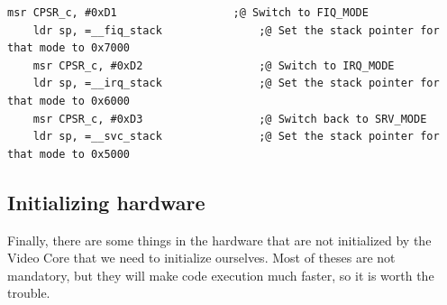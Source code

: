 \documentclass[12pt, svgnames]{book}
\begin{document}
\begin{lstlisting}[language=ASM,title={Code provided by \href{https://www.raspberrypi.org/forums/memberlist.php?mode=viewprofile&u=213434}{Leon de Boer}},captionpos=b]
	msr CPSR_c, #0xD1                  ;@ Switch to FIQ_MODE
	ldr sp, =__fiq_stack               ;@ Set the stack pointer for that mode to 0x7000
	msr CPSR_c, #0xD2                  ;@ Switch to IRQ_MODE
	ldr sp, =__irq_stack               ;@ Set the stack pointer for that mode to 0x6000
	msr CPSR_c, #0xD3                  ;@ Switch back to SRV_MODE
	ldr sp, =__svc_stack               ;@ Set the stack pointer for that mode to 0x5000
\end{lstlisting}


\subsection{Initializing hardware}

Finally, there are some things in the hardware that are not initialized by the Video Core that we need to initialize ourselves. Most of theses are not mandatory, but they will make code execution much faster, so it is worth the trouble.
\end{document}
